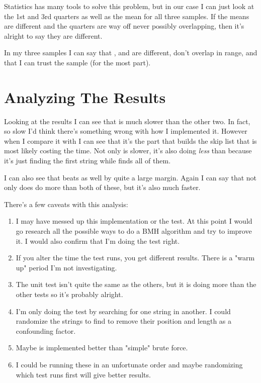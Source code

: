 Statistics has many tools to solve this problem, but in our case I can just
look at the 1st and 3rd quarters as well as the mean for all three samples.  If
the means are different and the quarters are way off never possibly
overlapping, then it's alright to say they are different.

In my three samples I can say that ,  and
 are different, don't overlap in range, and that I can trust the
sample (for the most part).


\section{Analyzing The Results}

Looking at the results I can see that  is much slower than
the other two.  In fact, so slow I'd think there's something wrong with how I
implemented it.  However when I compare it with  I
can see that it's the part that builds the skip list that is most likely
costing the time.  Not only is  slower, it's also doing \emph{less}
than  because it's just finding the first string while 
finds all of them.

I can also see that  beats  as well by quite a large
margin.  Again I can say that not only does  do more than both of
these, but it's also much faster.

There's a few caveats with this analysis:

\begin{enumerate}
\item I may have messed up this implementation or the test. At this
    point I would go research all the possible ways to do a BMH algorithm
    and try to improve it.  I would also confirm that I'm doing the test
    right.
\item If you alter the time the test runs, you get different results.
    There is a "warm up" period I'm not investigating.
\item The  unit test isn't quite the
    same as the others, but it is doing more than the other tests so
    it's probably alright.
\item I'm only doing the test by searching for one string in another.
    I could randomize the strings to find to remove their position
    and length as a confounding factor.
\item Maybe  is implemented better than "simple" brute force.
\item I could be running these in an unfortunate order and maybe randomizing
    which test runs first will give better results.
\end{enumerate}

